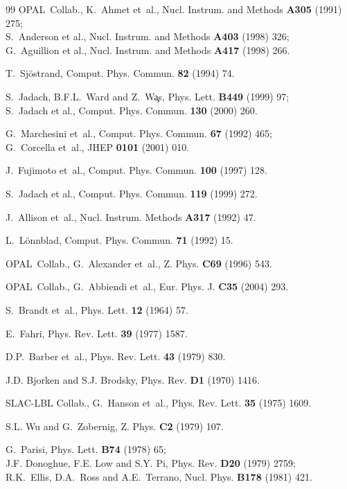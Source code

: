 \documentclass[12pt,a4paper,twoside]{article}
\newcommand{\Opal}{\mbox{\rm OPAL}}
\begin{document}
\begin{thebibliography}{99}
\Opal\ Collab., K.~Ahmet et~al., Nucl. Instrum. and Methods {\bf A305} (1991) 275;\\
S.~Anderson et al., Nucl. Instrum. and Methods {\bf A403} (1998) 326;\\
G.~Aguillion et al., Nucl. Instrum. and Methods {\bf A417} (1998) 266.
      

T.~Sj{\"o}strand, Comput. Phys. Commun. {\bf 82} (1994) 74.

S.~Jadach, B.F.L.~Ward and Z.~W\c{a}s, Phys. Lett. {\bf B449} (1999) 97;\\
S.~Jadach et al., Comput. Phys. Commun. {\bf 130} (2000) 260.

G.~Marchesini et~al., Comput. Phys. Commun. {\bf 67} (1992) 465;\\
G.~Corcella et~al., JHEP {\bf 0101} (2001) 010.

J.~Fujimoto et~al., Comput. Phys. Commun. {\bf 100} (1997) 128.

S.~Jadach et al., Comput. Phys. Commun. {\bf 119} (1999) 272.

J.~Allison et~al., Nucl. Instrum. Methods {\bf A317} (1992) 47.

L.~L{\"o}nnblad, Comput. Phys. Commun. {\bf 71} (1992) 15.

\Opal\ Collab., G.~Alexander et~al., Z. Phys. {\bf C69} (1996) 543.

\Opal\ Collab., G.~Abbiendi et~al., Eur. Phys. J. {\bf C35} (2004) 293.

S.~Brandt et~al., Phys. Lett. {\bf 12} (1964) 57.

E.~Fahri, Phys. Rev. Lett. {\bf 39} (1977) 1587.

D.P.~Barber et~al., Phys. Rev. Lett. {\bf 43} (1979) 830.

J.D. Bjorken and S.J. Brodsky, Phys. Rev. {\bf D1} (1970) 1416.

SLAC-LBL Collab., G.~Hanson et~al., Phys. Rev. Lett. {\bf 35} (1975) 1609.

S.L. Wu and G.~Zobernig, Z. Phys. {\bf C2} (1979) 107.

G.~Parisi, Phys. Lett. {\bf B74} (1978) 65; \\
J.F. Donoghue, F.E. Low and S.Y. Pi, Phys. Rev. {\bf D20} (1979) 2759; \\
R.K.~Ellis, D.A.~Ross and A.E.~Terrano, Nucl. Phys. {\bf B178} (1981) 421.


\end{thebibliography}
\end{document}

